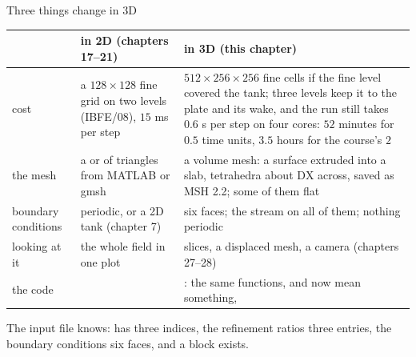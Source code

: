 \documentclass[aspectratio=169,11pt]{beamer}
\begin{document}
\begin{frame}{Three things change in 3D}
\label{fr:three}
\footnotesize
\begin{tabular}{@{}L{0.16\textwidth}L{0.38\textwidth}L{0.38\textwidth}@{}}
\toprule
& in 2D (chapters 17--21) & in 3D (this chapter) \\
\midrule
cost & a $128\times128$ fine grid on two levels (IBFE/08), $15$ ms per step & $512\times256\times256$ fine cells if the fine level covered the tank; three levels keep it to the plate and its wake, and the run still takes $0.6$ s per step on four cores: $52$ minutes for $0.5$ time units, $3.5$ hours for the course's $2$ \\
the mesh & a  or  of triangles from MATLAB or gmsh & a volume mesh: a surface extruded into a slab, tetrahedra about $\mathrm{DX}$ across, saved as MSH 2.2; some of them flat \\
boundary conditions & periodic, or a 2D tank (chapter 7) & six faces; the stream on all of them; nothing periodic \\
looking at it & the whole field in one plot & slices, a displaced mesh, a camera (chapters 27--28) \\
the code &  & : the same functions,  and  now mean something,  \\
\bottomrule
\end{tabular}

\medskip
The input file knows:  has three indices, the refinement ratios three entries, the boundary conditions six faces, and a  block exists.
\end{frame}
\end{document}
